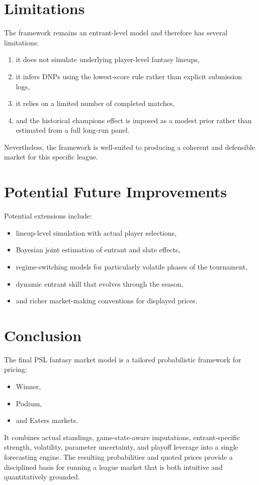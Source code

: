 \documentclass[11pt]{article}
\begin{document}
\section{Limitations}

The framework remains an entrant-level model and therefore has several limitations:
\begin{enumerate}[itemsep=2pt]
    \item it does not simulate underlying player-level fantasy lineups,
    \item it infers DNPs using the lowest-score rule rather than explicit submission logs,
    \item it relies on a limited number of completed matches,
    \item and the historical champions effect is imposed as a modest prior rather than estimated from a full long-run panel.
\end{enumerate}

Nevertheless, the framework is well-suited to producing a coherent and defensible market for this specific league.

\section{Potential Future Improvements}

Potential extensions include:
\begin{itemize}[itemsep=2pt]
    \item lineup-level simulation with actual player selections,
    \item Bayesian joint estimation of entrant and slate effects,
    \item regime-switching models for particularly volatile phases of the tournament,
    \item dynamic entrant skill that evolves through the season,
    \item and richer market-making conventions for displayed prices.
\end{itemize}

\section{Conclusion}

The final PSL fantasy market model is a tailored probabilistic framework for pricing:
\begin{itemize}[itemsep=2pt]
    \item Winner,
    \item Podium,
    \item and Eaters markets.
\end{itemize}

It combines actual standings, game-state-aware imputations, entrant-specific strength, volatility, parameter uncertainty, and playoff leverage into a single forecasting engine. The resulting probabilities and quoted prices provide a disciplined basis for running a league market that is both intuitive and quantitatively grounded.
\end{document}

